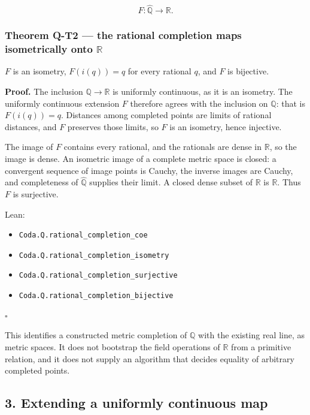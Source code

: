 \documentclass[
  11pt,
]{article}
\providecommand{\tightlist}{%
  \setlength{\itemsep}{0pt}\setlength{\parskip}{0pt}}
\begin{document}
\[
F:\widehat{\mathbb{Q}}\longrightarrow\mathbb{R}.
\]

\subsubsection{\texorpdfstring{Theorem Q-T2 --- the rational completion maps isometrically onto \(\mathbb{R}\)}{Theorem Q-T2 --- the rational completion maps isometrically onto \textbackslash mathbb\{R\}}}\label{theorem-q-t2-the-rational-completion-maps-isometrically-onto-mathbbr}

\(F\) is an isometry, \(F(i(q))=q\) for every rational \(q\), and \(F\) is bijective.

\textbf{Proof.} The inclusion \(\mathbb{Q}\to\mathbb{R}\) is uniformly continuous, as it is an isometry. The uniformly continuous extension \(F\) therefore agrees with the inclusion on \(\mathbb{Q}\): that is \(F(i(q))=q\). Distances among completed points are limits of rational distances, and \(F\) preserves those limits, so \(F\) is an isometry, hence injective.

The image of \(F\) contains every rational, and the rationals are dense in \(\mathbb{R}\), so the image is dense. An isometric image of a complete metric space is closed: a convergent sequence of image points is Cauchy, the inverse images are Cauchy, and completeness of \(\widehat{\mathbb{Q}}\) supplies their limit. A closed dense subset of \(\mathbb{R}\) is \(\mathbb{R}\). Thus \(F\) is surjective.

Lean:

\begin{itemize}
\tightlist
\item
  \nolinkurl{Coda.Q.rational_completion_coe}
\item
  \nolinkurl{Coda.Q.rational_completion_isometry}
\item
  \nolinkurl{Coda.Q.rational_completion_surjective}
\item
  \nolinkurl{Coda.Q.rational_completion_bijective}
\end{itemize}

\(\square\)

This identifies a constructed metric completion of \(\mathbb{Q}\) with the existing real line, as metric spaces. It does not bootstrap the field operations of \(\mathbb{R}\) from a primitive relation, and it does not supply an algorithm that decides equality of arbitrary completed points.

\subsection{3. Extending a uniformly continuous map}\label{extending-a-uniformly-continuous-map}
\end{document}
